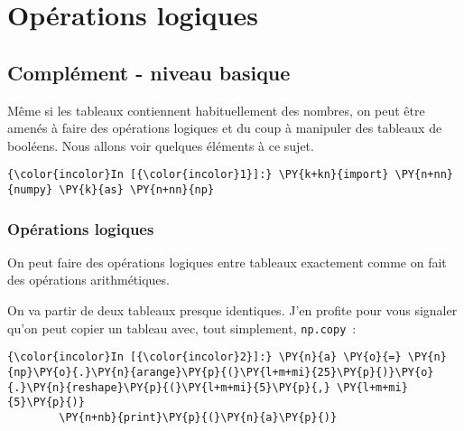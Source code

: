     
    
    
    

    

    \hypertarget{opuxe9rations-logiques}{%
\section{Opérations logiques}\label{opuxe9rations-logiques}}

    \hypertarget{compluxe9ment---niveau-basique}{%
\subsection{Complément - niveau
basique}\label{compluxe9ment---niveau-basique}}

    Même si les tableaux contiennent habituellement des nombres, on peut
être amenés à faire des opérations logiques et du coup à manipuler des
tableaux de booléens. Nous allons voir quelques éléments à ce sujet.

    \begin{Verbatim}[commandchars=\\\{\},frame=single,framerule=0.3mm,rulecolor=\color{cellframecolor}]
{\color{incolor}In [{\color{incolor}1}]:} \PY{k+kn}{import} \PY{n+nn}{numpy} \PY{k}{as} \PY{n+nn}{np}
\end{Verbatim}


    \hypertarget{opuxe9rations-logiques}{%
\subsubsection{Opérations logiques}\label{opuxe9rations-logiques}}

    On peut faire des opérations logiques entre tableaux exactement comme on
fait des opérations arithmétiques.

    On va partir de deux tableaux presque identiques. J'en profite pour vous
signaler qu'on peut copier un tableau avec, tout simplement,
\texttt{np.copy}~:

    \begin{Verbatim}[commandchars=\\\{\},frame=single,framerule=0.3mm,rulecolor=\color{cellframecolor}]
{\color{incolor}In [{\color{incolor}2}]:} \PY{n}{a} \PY{o}{=} \PY{n}{np}\PY{o}{.}\PY{n}{arange}\PY{p}{(}\PY{l+m+mi}{25}\PY{p}{)}\PY{o}{.}\PY{n}{reshape}\PY{p}{(}\PY{l+m+mi}{5}\PY{p}{,} \PY{l+m+mi}{5}\PY{p}{)}
        \PY{n+nb}{print}\PY{p}{(}\PY{n}{a}\PY{p}{)}
\end{Verbatim}


